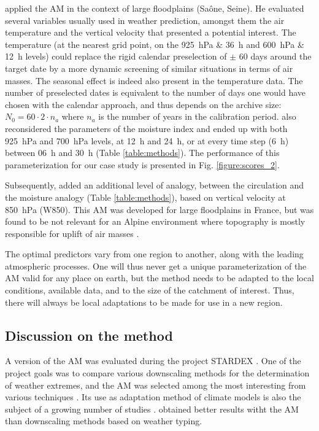 \documentclass[review]{elsarticle}
\begin{document}
\citet{BenDaoud2010} applied the AM in the context of large floodplains (Sa\^{o}ne, Seine). He evaluated several variables usually used in weather prediction, amongst them the air temperature and the vertical velocity that presented a potential interest. The temperature (at the nearest grid point, on the 925~hPa \& 36~h and 600~hPa \& 12~h levels) could replace the rigid calendar preselection of $\pm$ 60 days around the target date by a more dynamic screening of similar situations in terms of air masses. The seasonal effect is indeed also present in the temperature data. The number of preselected dates is equivalent to the number of days one would have chosen with the calendar approach, and thus depends on the archive size: $N_{0} = 60 \cdot 2 \cdot n_{a}$ where $n_{a}$ is the number of years in the calibration period. \citet{BenDaoud2010} also reconsidered the parameters of the moisture index and ended up with both 925~hPa and 700~hPa levels, at 12~h and 24~h, or at every time step (6~h) between 06~h and 30~h (Table \ref{table:methods}). The performance of this parameterization for our case study is presented in Fig. \ref{figure:scores_2}.

Subsequently, \citet{BenDaoud2010} added an additional level of analogy, between the circulation and the moisture analogy (Table \ref{table:methods}), based on vertical velocity at 850~hPa (W850). This AM was developed for large floodplains in France, but was found to be not relevant for an Alpine environment where topography is mostly responsible for uplift of air masses \citep{Horton2012}. 

The optimal predictors vary from one region to another, along with the leading atmospheric processes. One will thus never get a unique parameterization of the AM valid for any place on earth, but the method needs to be adapted to the local conditions, available data, and to the size of the catchment of interest. Thus, there will always be local adaptations to be made for use in a new region.


\subsection{Discussion on the method}

A version of the AM was evaluated during the project STARDEX \citep[\textit{STAtistical and Regional dynamical Downscaling of EXtremes for European regions}, see][]{Goodess2003, Stardex2005}. One of the project goals was to compare various downscaling methods for the determination of weather extremes, and the AM was selected among the most interesting from various techniques \citep{Maheras2005, Schmidli2007}. Its use as adaptation method of climate models is also the subject of a growing number of studies \citep{Zorita1999, Wetterhall2005, Wetterhall2007, Matulla2007, Chardon2014, Dayon2015}. \citet{Bliefernicht2010} obtained better results witht the AM than downscaling methods based on weather typing.
\end{document}
